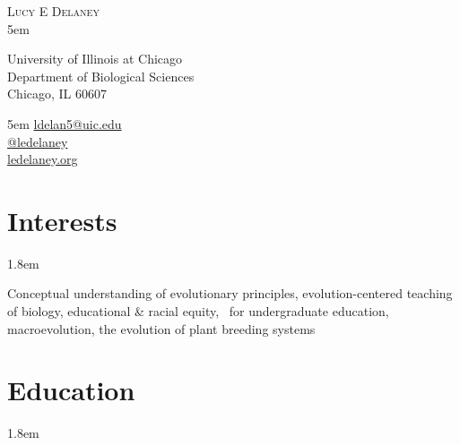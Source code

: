\documentclass[]{article}
\begin{document}
\BgThispage
\pagestyle{alldocument}

{\fontsize{20}{64}\selectfont \textsc{Lucy E Delaney}}\\

\leftskip 5em
\begin{multicols}{2}

University of Illinois at Chicago\\
Department of Biological Sciences\\
Chicago, IL 60607

\columnbreak

\begin{flushright}
\rightskip 5em
\href{mailto:ldelan5@uic.edu}{ldelan5@uic.edu} \textcolor{light-gray}{\faPaperPlane}\\
\href{https://github.com/ledelaney}{@ledelaney} \textcolor{light-gray}{\faGithub}\\
\href{https://ledelaney.org}{ledelaney.org} \textcolor{light-gray}{\faDesktop}
\end{flushright}

\end{multicols}

\vspace{0.5mm}

\section{Interests}
\vspace{3mm}

\leftskip 1.8em

Conceptual understanding of evolutionary principles, evolution-centered teaching of biology, educational \& racial equity, \textcolor{light-gray}{\faRProject}\ for undergraduate education, macroevolution, the evolution of plant breeding systems

\section{Education}

\vspace{4mm}
\leftskip 1.8em
\end{document}
